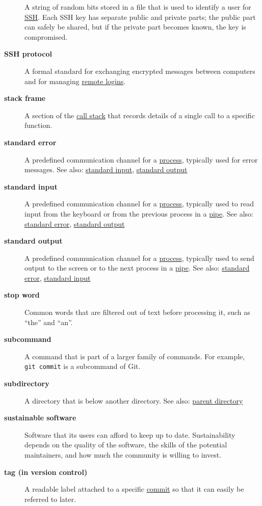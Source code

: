 \documentclass[
]{krantz}
\begin{document}
\begin{description}
A string of random bits stored in a file that is used to identify a user for \protect\hyperlink{ssh}{SSH}. Each SSH key has separate public and private parts; the public part can safely be shared, but if the private part becomes known, the key is compromised.
\item[\textbf{SSH protocol}]
A formal standard for exchanging encrypted messages between computers and for managing \protect\hyperlink{remote_login_server}{remote logins}.
\item[\textbf{stack frame}]
A section of the \protect\hyperlink{call_stack}{call stack} that records details of a single call to a specific function.
\item[\textbf{standard error}]
A predefined communication channel for a \protect\hyperlink{process}{process}, typically used for error messages. See also: \protect\hyperlink{stdin}{standard input}, \protect\hyperlink{stdout}{standard output}
\item[\textbf{standard input}]
A predefined communication channel for a \protect\hyperlink{process}{process}, typically used to read input from the keyboard or from the previous process in a \protect\hyperlink{pipe_shell}{pipe}. See also: \protect\hyperlink{stderr}{standard error}, \protect\hyperlink{stdout}{standard output}
\item[\textbf{standard output}]
A predefined communication channel for a \protect\hyperlink{process}{process}, typically used to send output to the screen or to the next process in a \protect\hyperlink{pipe_shell}{pipe}. See also: \protect\hyperlink{stderr}{standard error}, \protect\hyperlink{stdin}{standard input}
\item[\textbf{stop word}]
Common words that are filtered out of text before processing it, such as ``the'' and ``an''.
\item[\textbf{subcommand}]
A command that is part of a larger family of commands. For example, \texttt{git\ commit} is a subcommand of Git.
\item[\textbf{subdirectory}]
A directory that is below another directory. See also: \protect\hyperlink{parent_directory}{parent directory}
\item[\textbf{sustainable software}]
Software that its users can afford to keep up to date. Sustainability depends on the quality of the software, the skills of the potential maintainers, and how much the community is willing to invest.
\item[\textbf{tag (in version control)}]
A readable label attached to a specific \protect\hyperlink{commit}{commit} so that it can easily be referred to later.

\end{description}
\end{document}
